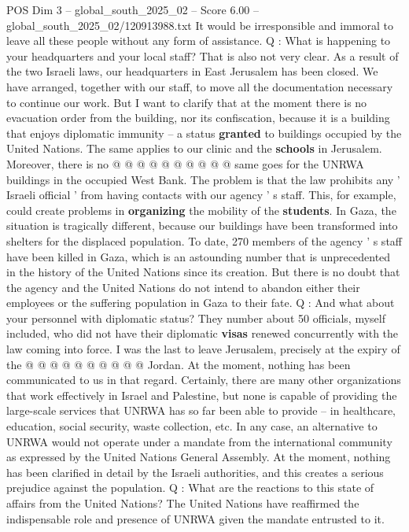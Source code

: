\begin{textsample}{POS Dim 3 – global\_south\_2025\_02 – Score 6.00 – global\_south\_2025\_02/120913988.txt}
It would be irresponsible and immoral to leave all these people without any form of assistance.
Q : What is happening to your headquarters and your local staff?
That is also not very clear.
As a result of the two Israeli laws, our headquarters in East Jerusalem has been closed.
We have arranged, together with our staff, to move all the documentation necessary to continue our work.
But I want to clarify that at the moment there is no evacuation order from the building, nor its confiscation, because it is a building that enjoys diplomatic immunity -- a status \textbf{granted} to buildings occupied by the United Nations.
The same applies to our clinic and the \textbf{schools} in Jerusalem.
Moreover, there is no @ @ @ @ @ @ @ @ @ @ same goes for the UNRWA buildings in the occupied West Bank.
The problem is that the law prohibits any ' Israeli official ' from having contacts with our agency ' s staff.
This, for example, could create problems in \textbf{organizing} the mobility of the \textbf{students}.
In Gaza, the situation is tragically different, because our buildings have been transformed into shelters for the displaced population.
To date, 270 members of the agency ' s staff have been killed in Gaza, which is an astounding number that is unprecedented in the history of the United Nations since its creation.
But there is no doubt that the agency and the United Nations do not intend to abandon either their employees or the suffering population in Gaza to their fate.
Q : And what about your personnel with diplomatic status?
They number about 50 officials, myself included, who did not have their diplomatic \textbf{visas} renewed concurrently with the law coming into force.
I was the last to leave Jerusalem, precisely at the expiry of the @ @ @ @ @ @ @ @ @ @ Jordan.
At the moment, nothing has been communicated to us in that regard.
Certainly, there are many other organizations that work effectively in Israel and Palestine, but none is capable of providing the large-scale services that UNRWA has so far been able to provide -- in healthcare, education, social security, waste collection, etc.
In any case, an alternative to UNRWA would not operate under a mandate from the international community as expressed by the United Nations General Assembly.
At the moment, nothing has been clarified in detail by the Israeli authorities, and this creates a serious prejudice against the population.
Q : What are the reactions to this state of affairs from the United Nations?
The United Nations have reaffirmed the indispensable role and presence of UNRWA given the mandate entrusted to it.

\end{textsample}

